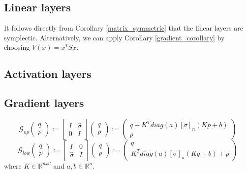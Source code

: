 \documentclass[twoside,a4paper]{article}
\begin{document}

\subsection{Linear layers}

It follows directly from Corollary \ref{matrix_symmetric} that the linear layers are
symplectic. Alternatively, we can apply Corollary \ref{gradient_corollary} by
choosing $V(x) = x^TSx$.

\subsection{Activation layers}

\subsection{Gradient layers}

\begin{equation*}
	\mathcal{G}_{up} \begin{pmatrix}
		q \\
		p
	\end{pmatrix} := \begin{bmatrix}
		I & \hat{\sigma} \\
		0 & I
	\end{bmatrix} \begin{pmatrix}
		q \\
		p
	\end{pmatrix} := \begin{pmatrix}
		q + K^T diag(a) [\sigma]_n(Kp + b) \\
		p
	\end{pmatrix}
\end{equation*}
\begin{equation*}
	\mathcal{G}_{low} \begin{pmatrix}
		q \\
		p
	\end{pmatrix} := \begin{bmatrix}
		I & 0 \\
		\hat{\sigma} & I
	\end{bmatrix} \begin{pmatrix}
		q \\
		p
	\end{pmatrix} := \begin{pmatrix}
		q \\
		K^T diag(a) [\sigma]_n(Kq + b) + p
	\end{pmatrix}
\end{equation*}
where $K \in \mathbb{R}^{nxd}$ and $a,b \in \mathbb{R}^n$.
\end{document}
